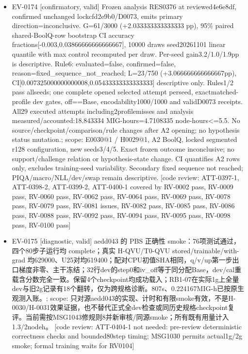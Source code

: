 \documentclass[11pt]{article}
\begin{document}
\begin{itemize}
\item EV-0174 [confirmatory, valid] Frozen analysis RES0376 at reviewed4e6e8df, confirmed unchanged lockcfd2e9b0/D0073, emits primary direction=inconclusive. G=61/3000 (+2.033333333333333 pp), 95\% paired shared-BoolQ-row bootstrap CI accuracy fractions[-0.003,0.03866666666666667], 10000 draws seed20261101 linear quantile with max control recomputed per draw. Per-seed gain3.2/1.0/1.9pp is descriptive. Rule6: evaluated=false, confirmed=false, reason=fixed\_sequence\_not\_reached; L=23/750 (+3.066666666666667pp), CI[0.007325000000000008,0.05433333333333333] descriptive only. Rules1/2 pass allseeds; one complete opened selected attempt perseed, exactmatched-profile dev gates, off==Base, encodability1000/1000 and validD0073 receipts. All29 executed attempts including2profilemisses and analysis measured/accounted:18.843334 MIG-hours=4.7108335 node-hours\textless{}=5.5. No source/checkpoint/comparison/rule changes after A2 opening; no hypothesis status mutation.; scope: E0030@1 / H0029@1, A2 BoolQ, locked segmented r128 configuration, new seeds3/4/5. Exact frozen outcome inconclusive; no support/challenge relation or hypothesis-state change. CI quantifies A2 rows only, excludes training-seed variability. Secondary fixed sequence not reached; PIQA/macro/NLL/dev/swap remain descriptive. [code review: ATT-0397-1, ATT-0398-2, ATT-0399-2, ATT-0400-1 covered by RV-0002 pass, RV-0009 pass, RV-0060 pass, RV-0062 pass, RV-0064 pass, RV-0069 pass, RV-0078 pass, RV-0079 pass, RV-0081 issues, RV-0082 pass, RV-0085 pass, RV-0086 pass, RV-0088 pass, RV-0092 pass, RV-0094 pass, RV-0095 pass, RV-0098 pass, RV-0100 pass]
\item EV-0175 [diagnostic, valid] aedd043 的 PBS 正确性 smoke：76项测试通过，四个80步子运行均 complete；真实 H-QVU/T0-QVU stored/trainable/with-grad 均629000、U25对均619400；配对CPU初值SHA相同，q/v/up第一步出口梯度非零、主干冻结；32行dev的step0和iv\_off等于同分配Base，dev/cal重载含分数完全一致。保留4个checkpoint均成功载入；RB1-07在实际1g上全量dev与旧2g记录有18个翻转，仅为跨规格诊断。807s、0.224167MIG-h已按原生观测入账。; scope: 只对源aedd043的实现、计时和有限smoke有效，不是H-0030/H-0031效果证据，也不替代正式全dev检查或同历史规格checkpoint复评。当前需按MSG1043修规则8并新审核/同源smoke；所有既有用量计入1.3/2nodeh。 [code review: ATT-0404-1 not needed: pre-review deterministic correctness checks and bounded80step timing; MSG1030 permits actual1g/2g smoke; formal training waits for RV0104]

\end{itemize}
\end{document}
